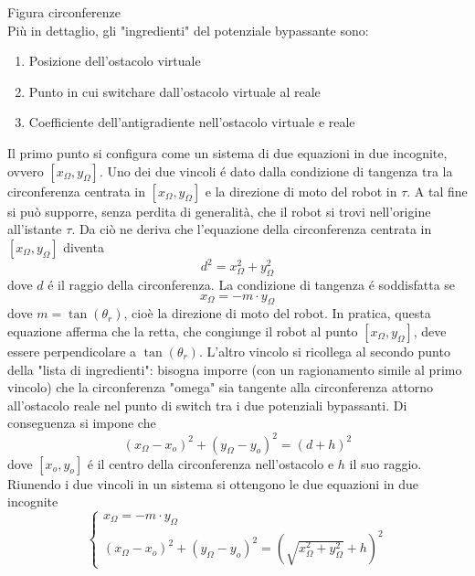 \documentclass[14pt,a4paper]{extarticle}
\begin{document}
Figura circonferenze\\

Più in dettaglio, gli "ingredienti" del potenziale bypassante sono:
\begin{enumerate}
\item Posizione dell'ostacolo virtuale
\item Punto in cui switchare dall'ostacolo virtuale al reale
\item Coefficiente dell'antigradiente nell'ostacolo virtuale e reale
\end{enumerate}
Il primo punto si configura come un sistema di due equazioni in due incognite, ovvero \([x_{\Omega}, y_{\Omega}]\). Uno dei due vincoli é dato dalla condizione di tangenza tra la circonferenza centrata in  \([x_{\Omega}, y_{\Omega}]\) e la direzione di moto del robot in \(\tau\). A tal fine si può supporre, senza perdita di generalità, che il robot si trovi nell'origine all'istante \(\tau\). Da ciò ne deriva che l'equazione della circonferenza centrata in \([x_{\Omega}, y_{\Omega}]\) diventa \[d^2=x_{\Omega}^2+y_{\Omega}^2\] dove \(d\) é il raggio della circonferenza. La condizione di tangenza é soddisfatta se \[x_{\Omega} = -m\cdot  y_{\Omega}\] dove \(m = \tan(\theta_r)\), cioè la direzione di moto del robot. In pratica, questa equazione afferma che la retta, che congiunge il robot al punto \([x_{\Omega}, y_{\Omega}]\), deve essere perpendicolare a \(\tan(\theta_r)\). L'altro vincolo si ricollega al secondo punto della "lista di ingredienti": bisogna imporre (con un ragionamento simile al primo vincolo) che la circonferenza "omega" sia tangente alla circonferenza attorno all'ostacolo reale nel punto di switch tra i due potenziali bypassanti. Di conseguenza si impone che \[(x_{\Omega} - x_o)^2 + (y_{\Omega} - y_o)^2 = (d+h)^2\] dove \([x_o, y_o]\) é il centro della circonferenza nell'ostacolo e \(h\) il suo raggio. Riunendo i due vincoli in un sistema si ottengono le due equazioni in due incognite
\begin{equation}
\begin{cases}
x_{\Omega} = -m\cdot  y_{\Omega} \\
(x_{\Omega} - x_o)^2 + (y_{\Omega} - y_o)^2 = (\sqrt{x_{\Omega}^2+y_{\Omega}^2}+h)^2
\end{cases}
\end{equation}
\end{document}
